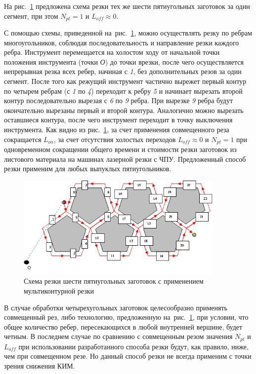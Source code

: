 \documentclass[11pt,twoside,openany]{report}
\begin{document}
На рис.~\ref{5-1}
предложена схема резки тех же шести
пятиугольных заготовок за один сегмент, при этом
$N_{pt}=1$
и $L_{off} \approx 0$.

С помощью схемы, приведенной
на~рис.~\ref{5-1},
можно осуществлять резку по ребрам многоугольников,
соблюдая последовательность и направление резки каждого ребра.
Инструмент перемещается на холостом ходу от
начальной точки положения инструмента
(точки {\it О})
до точки врезки, после чего осуществляется непрерывная резка всех ребер,
начиная с {\it 1},
без дополнительных резов за один сегмент.
После того как режущий инструмент частично вырежет
первый контур по четырем ребрам (с {\it 1} по {\it 4})
переходит к ребру {\it 5} и начинает вырезать
второй контур последовательно вырезая с {\it 6} по {\it 9} ребра.
При вырезке {\it 9} ребра будут окончательно
вырезаны первый и второй контура.
Аналогично можно вырезать оставшиеся контура,
после чего инструмент переходит в точку выключения инструмента.
Как видно из рис.~\ref{5-1},
за счет применения совмещенного реза сокращается $L_{on}$,
за счет отсутствия холостых переходов
$L_{off} \approx 0$
и $N_{pt}=1$
при одновременном сокращении общего времени
и стоимости резки заготовок из листового
материала на машинах лазерной резки с ЧПУ.
Предложенный способ резки применим для любых выпуклых пятиугольников.

\begin{figure}[h]
  \begin{center}
  \includegraphics[width=0.9\textwidth]{5-1.png}
  \caption{Схема резки шести пятиугольных заготовок
  с применением мультиконтурной резки}
  \label{5-1}
  \end{center}
\end{figure}

В случае обработки четырехугольных заготовок
целесообразно применять совмещенный рез,
либо технологию, предложенную
на~рис.~\ref{5-1},
при условии, что общее количество ребер,
пересекающихся в любой внутренней вершине, будет четным.
В последнем случае по сравнению с совмещенным резом значения
$N_{pt}$
и $L_{off}$
при использовании разработанного способа резки будут,
как правило, ниже, чем при совмещенном резе.
Но данный способ резки не всегда применим
с точки зрения снижения КИМ.
\end{document}
